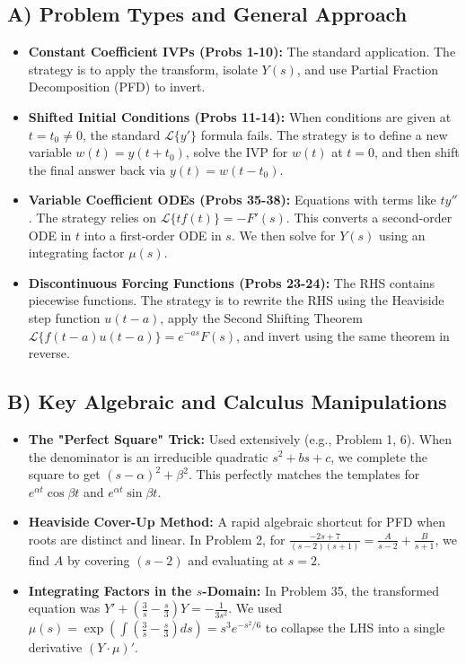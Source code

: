 \documentclass[11pt, letterpaper]{article}
\theoremstyle{definition}
\theoremstyle{remark}
\newcommand{\Lap}{\mathcal{L}}
\begin{document}
\subsection{A) Problem Types and General Approach}
\begin{itemize}
    \item \textbf{Constant Coefficient IVPs (Probs 1-10):} The standard application. The strategy is to apply the transform, isolate $Y(s)$, and use Partial Fraction Decomposition (PFD) to invert.
    \item \textbf{Shifted Initial Conditions (Probs 11-14):} When conditions are given at $t = t_0 \neq 0$, the standard $\Lap\{y'\}$ formula fails. The strategy is to define a new variable $w(t) = y(t + t_0)$, solve the IVP for $w(t)$ at $t=0$, and then shift the final answer back via $y(t) = w(t - t_0)$.
    \item \textbf{Variable Coefficient ODEs (Probs 35-38):} Equations with terms like $t y''$. The strategy relies on $\Lap\{t f(t)\} = -F'(s)$. This converts a second-order ODE in $t$ into a first-order ODE in $s$. We then solve for $Y(s)$ using an integrating factor $\mu(s)$.
    \item \textbf{Discontinuous Forcing Functions (Probs 23-24):} The RHS contains piecewise functions. The strategy is to rewrite the RHS using the Heaviside step function $u(t-a)$, apply the Second Shifting Theorem $\Lap\{f(t-a)u(t-a)\} = e^{-as}F(s)$, and invert using the same theorem in reverse.
\end{itemize}

\subsection{B) Key Algebraic and Calculus Manipulations}
\begin{itemize}
    \item \textbf{The "Perfect Square" Trick:} Used extensively (e.g., Problem 1, 6). When the denominator is an irreducible quadratic $s^2 + bs + c$, we complete the square to get $(s - \alpha)^2 + \beta^2$. This perfectly matches the templates for $e^{\alpha t}\cos \beta t$ and $e^{\alpha t}\sin \beta t$.
    \item \textbf{Heaviside Cover-Up Method:} A rapid algebraic shortcut for PFD when roots are distinct and linear. In Problem 2, for $\frac{-2s+7}{(s-2)(s+1)} = \frac{A}{s-2} + \frac{B}{s+1}$, we find $A$ by covering $(s-2)$ and evaluating at $s=2$.
    \item \textbf{Integrating Factors in the $s$-Domain:} In Problem 35, the transformed equation was $Y' + (\frac{3}{s} - \frac{s}{3})Y = -\frac{1}{3s^2}$. We used $\mu(s) = \exp(\int (\frac{3}{s} - \frac{s}{3}) ds) = s^3 e^{-s^2/6}$ to collapse the LHS into a single derivative $(Y \cdot \mu)'$.
\end{itemize}
\end{document}
